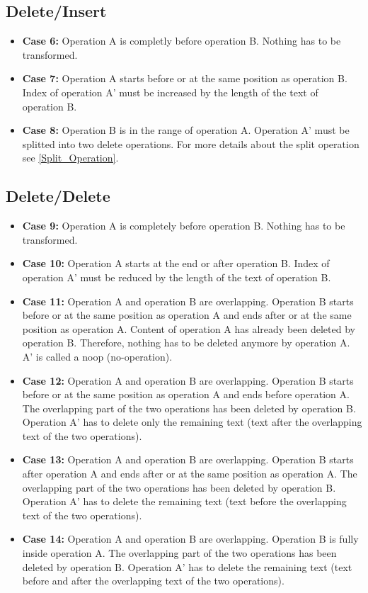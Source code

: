 \subsection{Delete/Insert}
\label{Delete_Insert}
\begin{itemize}
\item \textbf{Case 6:}
Operation A is completly before operation B. Nothing has to be transformed.
\item \textbf{Case 7:}
Operation A starts before or at the same position as operation B. Index of operation A' must be increased by the length of the text of operation B.
\item \textbf{Case 8:}
Operation B is in the range of operation A. Operation A' must be splitted into two delete operations. For more details about the split operation see \ref{Split_Operation}.
\end{itemize}

\subsection{Delete/Delete}
\begin{itemize}
\item \textbf{Case 9:}
Operation A is completely before operation B. Nothing has to be transformed.
\item \textbf{Case 10:}
Operation A starts at the end or after operation B. Index of operation A' must be reduced by the length of the text of operation B.
\item \textbf{Case 11:}
Operation A and operation B are overlapping. Operation B starts before or at the same position as operation A and ends after or at the same position as operation A. Content of operation A has already been deleted by operation B. Therefore, nothing has to be deleted anymore by operation A. A' is called a noop (no-operation).
\item \textbf{Case 12:}
Operation A and operation B are overlapping. Operation B starts before or at the same position as operation A and ends before operation A. The overlapping part of the two operations has been deleted by operation B. Operation A' has to delete only the remaining text (text after the overlapping text of the two operations).
\item \textbf{Case 13:}
Operation A and operation B are overlapping. Operation B starts after operation A and ends after or at the same position as operation A. The overlapping part of the two operations has been deleted by operation B. Operation A' has to delete the remaining text (text before the overlapping text of the two operations).
\item \textbf{Case 14:}
Operation A and operation B are overlapping. Operation B is fully inside operation A. The overlapping part of the two operations has been deleted by operation B. Operation A' has to delete the remaining text (text before and after the overlapping text of the two operations).
\end{itemize}
